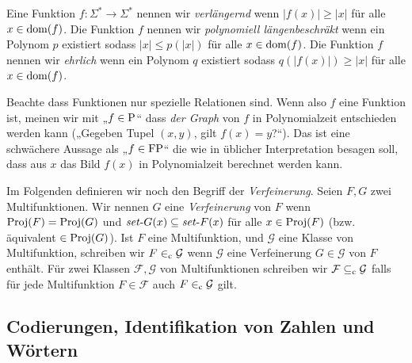 Eine Funktion $f\colon\Sigma^*\to\Sigma^*$ nennen wir \emph{verlängernd} wenn $|f(x)|\geq |x|$ für alle $x\in\dom(f)$.
Die Funktion $f$ nennen wir \emph{polynomiell längenbeschräkt} wenn ein Polynom $p$ existiert sodass $|x|\leq p(|x|)$ für alle $x\in\dom(f)$.
Die Funktion $f$ nennen wir \emph{ehrlich} wenn ein Polynom $q$ existiert sodass $q(|f(x)|)\geq |x|$ für alle $x\in\dom(f)$.

Beachte dass Funktionen nur spezielle Relationen sind. Wenn also $f$ eine Funktion ist, meinen wir mit „$f\in\P$“ dass \emph{der Graph} von $f$ in Polynomialzeit entschieden werden kann („Gegeben Tupel $(x, y)$, gilt $f(x)=y$?“). Das ist eine schwächere Aussage als „$f\in\FP$“ die wie in üblicher Interpretation besagen soll, dass aus $x$ das Bild $f(x)$ in Polynomialzeit berechnet werden kann.

Im Folgenden definieren wir noch den Begriff der \emph{Verfeinerung}. Seien $F, G$ zwei Multifunktionen. Wir nennen $G$ eine \emph{Verfeinerung} von $F$ wenn $\Proj(F)=\Proj(G)$ und $\fset{}G(x)\subseteq \fset{}F(x)$ für alle $x\in\Proj(F)$ (bzw. äquivalent $\in \Proj(G)$).
Ist $F$ eine Multifunktion, und $\mathcal G$ eine Klasse von Multifunktion, schreiben wir $F\inc \mathcal G$ wenn $\mathcal G$ eine Verfeinerung $G\in\mathcal G$ von $F$ enthält.
Für zwei Klassen $\mathcal F, \mathcal G$ von Multifunktionen schreiben wir $\mathcal F \subseteqc \mathcal G$ falls für jede Multifunktion $F\in\mathcal F$ auch $F\inc \mathcal G$ gilt.

\subsection*{Codierungen, Identifikation von Zahlen und Wörtern}

